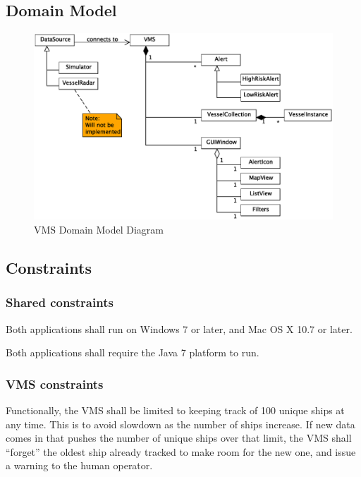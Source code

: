 \documentclass{article}
\begin{document}
\subsection{Domain Model} %

\begin{figure}[h]
\caption{VMS Domain Model Diagram}
\includegraphics[width=\linewidth]{domain-model.eps}
\end{figure}

\subsection{Constraints} %

\subsubsection{Shared constraints}
Both applications shall run on Windows 7 or later, and Mac OS X 10.7 or later.

Both applications shall require the Java 7 platform to run.

\subsubsection{VMS constraints}
Functionally, the VMS shall be limited to keeping track of 100 unique ships at any time. This is to avoid slowdown as the number of ships increase. If new data comes in that pushes the number of unique ships over that limit, the VMS shall ``forget'' the oldest ship already tracked to make room for the new one, and issue a warning to the human operator.
\end{document}
